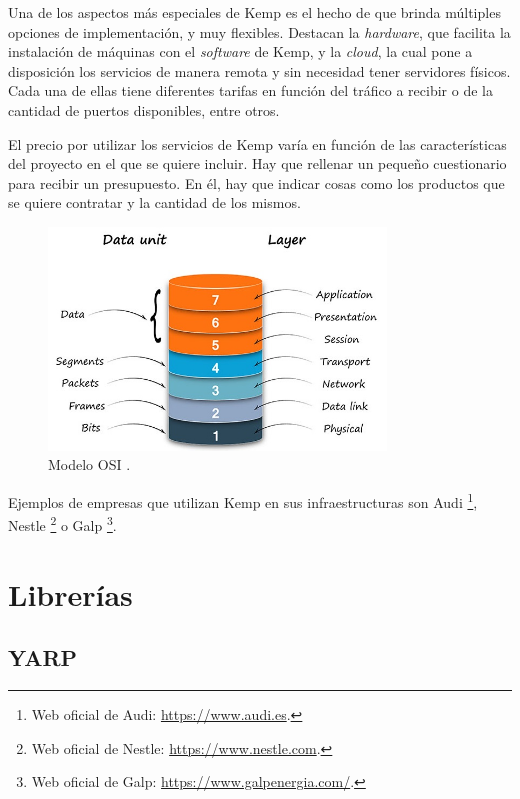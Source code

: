 \documentclass[11pt,spanish,listoffigures]{tfgetsinf}
\begin{document}
Una de los aspectos más especiales de Kemp es el hecho de que brinda múltiples opciones de implementación, y muy flexibles. Destacan la \emph{hardware}, que facilita la instalación de máquinas con el \emph{software} de Kemp, y la \emph{cloud}, la cual pone a disposición los servicios de manera remota y sin necesidad tener servidores físicos. Cada una de ellas tiene diferentes tarifas en función del tráfico a recibir o de la cantidad de puertos disponibles, entre otros.

El precio por utilizar los servicios de Kemp varía en función de las características del proyecto en el que se quiere incluir. Hay que rellenar un pequeño cuestionario para recibir un presupuesto. En él, hay que indicar cosas como los productos que se quiere contratar y la cantidad de los mismos.

\begin{figure}[ht]
\centering
\includegraphics[width=0.8\textwidth]{imagenes/modeloOSI}
\caption[Modelo OSI.]{Modelo OSI \cite{OSI}.}
	\label{modeloOSI}
\end{figure}

Ejemplos de empresas que utilizan Kemp en sus infraestructuras son Audi \footnote{Web oficial de Audi: \url{https://www.audi.es}.}, Nestle \footnote{Web oficial de Nestle: \url{https://www.nestle.com}.} o Galp \footnote{Web oficial de Galp: \url{https://www.galpenergia.com/}.}.


	\section{Librerías}


		\subsection{YARP}
\end{document}
